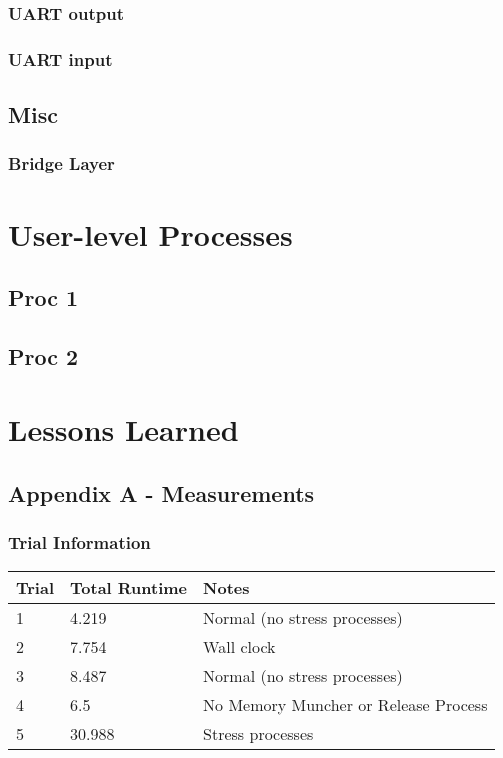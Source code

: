 \documentclass[12pt]{report}
\begin{document}
\section{UART output}

\section{UART input}

\chapter{Misc}

\section{Bridge Layer}

\part{User-level Processes}

\chapter{Proc 1}

\chapter{Proc 2}

\part{Lessons Learned}

\chapter{Appendix A - Measurements}


\section{Trial Information}
\begin{tabular}{l | l | l}
    Trial&Total Runtime&Notes \\
    \hline
    1&4.219&Normal (no stress processes) \\
    2&7.754&Wall clock \\
    3&8.487&Normal (no stress processes)\\
    4&6.5&No Memory Muncher or Release Process \\
    5&30.988&Stress processes \\
\end{tabular}
\end{document}

